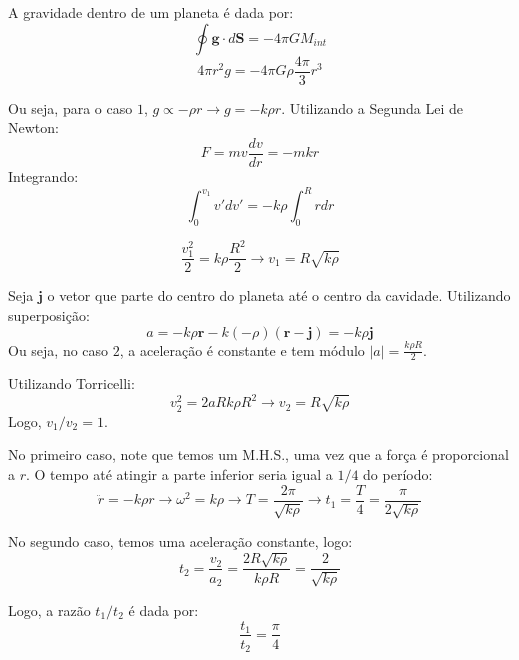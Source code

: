 \documentclass[11pt]{article}
\begin{document}
\begin{pproblem}
    \begin{pssolution*}{}{}
        \begin{alternativas}
            \item A gravidade dentro de um planeta é dada por:
            \[\oint\mathbf{g}\cdot d\mathbf{S} = -4\pi GM_{int}\]
            \[4\pi r^2g = -4\pi G \rho \frac{4\pi}{3}r^3\]

            Ou seja, para o caso \(1\), \(g \propto -\rho r \rightarrow g = -k\rho r\). Utilizando a Segunda Lei de Newton:
            \[F = mv\frac{dv}{dr} = -mkr\]
            Integrando:
            \[\int_0^{v_1} v'dv' =-k\rho\int_0^R rdr\]

            \[\frac{v_1^2}{2} = k\rho\frac{R^2}{2} \rightarrow \boxed{v_1 = R \sqrt{k\rho}}\]

            Seja \(\mathbf{j}\) o vetor que parte do centro do planeta até o centro da cavidade. Utilizando superposição:
            \[a = -k\rho\mathbf{r} - k(-\rho)(\mathbf{r}-\mathbf{j}) = -k\rho\mathbf{j}\]
            Ou seja, no caso \(2\), a aceleração é constante e tem módulo \(|a| = \frac{k\rho R}{2}\).
            
            Utilizando Torricelli:
            \[v_2^2 = 2aR k\rho R^2 \rightarrow \boxed{v_2 = R\sqrt{k\rho}}\]
            Logo, \(v_1/v_2 = 1\).

            \item No primeiro caso, note que temos um M.H.S., uma vez que a força é proporcional a \(r\). O tempo até atingir a parte inferior seria igual a \(1/4\) do período:
            \[\ddot{r} = -k\rho r \rightarrow \omega^2 = k\rho \rightarrow T = \frac{2\pi}{\sqrt{k\rho}} \rightarrow t_1 = \frac{T}{4} = \frac{\pi}{2\sqrt{k\rho}}\]

            No segundo caso, temos uma aceleração constante, logo:
            \[t_2 = \frac{v_2}{a_2} = \frac{2R\sqrt{k\rho}}{k\rho R} = \frac{2}{\sqrt{k\rho}}\]

            Logo, a razão \(t_1/t_2\) é dada por:
            \[\boxed{\frac{t_1}{t_2} = \frac{\pi}{4}}\]

        \end{alternativas}
    \end{pssolution*}
\end{pproblem}
\end{document}
